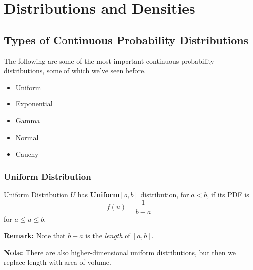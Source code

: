 \documentclass[letterpaper]{article}
\begin{document}
\section{Distributions and Densities}
\subsection{Types of Continuous Probability Distributions}
The following are some of the most important continuous probability distributions, some of which we've seen before. 
\begin{itemize}
    \item Uniform 
    \item Exponential 
    \item Gamma 
    \item Normal 
    \item Cauchy 
\end{itemize}

\subsubsection{Uniform Distribution}
\begin{definition}{Uniform Distribution}{}
    $U$ has \textbf{Uniform}$[a, b]$ distribution, for $a < b$, if its PDF is 
    \[f(u) = \frac{1}{b - a}\]
    for $a \leq u \leq b$. 
\end{definition}
\textbf{Remark:} Note that $b - a$ is the \emph{length} of $[a, b]$. 

\textbf{Note:} There are also higher-dimensional uniform distributions, but then we replace length with area of volume. 
\end{document}

